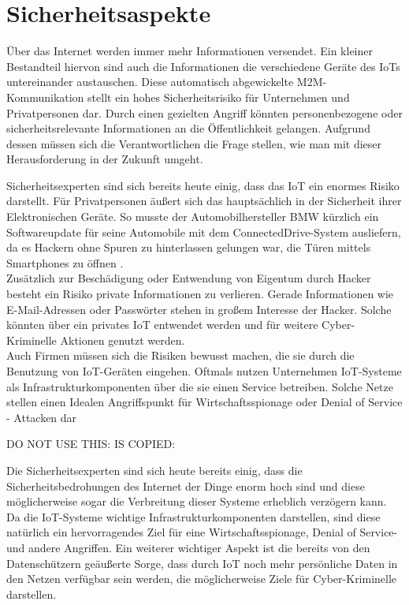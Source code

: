 \section{Sicherheitsaspekte}\label{s:Sicherheitsaspekte}

Über das Internet werden  immer mehr Informationen versendet. Ein kleiner Bestandteil hiervon sind auch die Informationen die verschiedene Geräte des \ac{IoT}s untereinander austauschen.
Diese automatisch abgewickelte \ac{M2M}-Kommunikation stellt ein hohes Sicherheitsrisiko für Unternehmen und Privatpersonen dar. Durch einen gezielten Angriff könnten personenbezogene oder sicherheitsrelevante Informationen an die Öffentlichkeit gelangen. Aufgrund dessen müssen sich die Verantwortlichen die Frage stellen, wie man mit dieser Herausforderung in der Zukunft umgeht. 

Sicherheitsexperten sind sich bereits heute einig, dass das \ac{IoT} ein enormes Risiko darstellt\cite{ws:iotsec}. Für Privatpersonen äußert sich das hauptsächlich in der Sicherheit ihrer Elektronischen Geräte. So musste der Automobilhersteller BMW kürzlich ein Softwareupdate für seine Automobile mit dem ConnectedDrive-System ausliefern, da es Hackern ohne Spuren zu hinterlassen gelungen war, die Türen mittels Smartphones zu öffnen \cite{ws:zeitbmw}.\\

Zusätzlich zur Beschädigung oder Entwendung von Eigentum durch Hacker besteht ein Risiko private Informationen zu verlieren. Gerade Informationen wie E-Mail-Adressen oder Passwörter stehen in großem Interesse der Hacker. Solche könnten über ein privates \ac{IoT} entwendet werden und für weitere Cyber-Kriminelle Aktionen genutzt werden. \\

Auch Firmen müssen sich die Risiken bewusst machen, die sie durch die Benutzung von \ac{IoT}-Geräten eingehen. Oftmals nutzen Unternehmen \ac{IoT}-Systeme als Infrastrukturkomponenten über die sie einen Service betreiben. Solche Netze stellen einen Idealen Angriffspunkt für Wirtschaftsspionage oder Denial of Service - Attacken dar


DO NOT USE THIS: IS COPIED:




Die Sicherheitsexperten sind sich heute bereits einig, dass die Sicherheitsbedrohungen des Internet der Dinge enorm hoch sind und diese möglicherweise sogar die Verbreitung dieser Systeme erheblich verzögern kann. Da die IoT-Systeme wichtige Infrastrukturkomponenten darstellen, sind diese natürlich ein hervorragendes Ziel für eine Wirtschaftsspionage, Denial of Service- und andere Angriffen. Ein weiterer wichtiger Aspekt ist die bereits von den Datenschützern geäußerte Sorge, dass durch IoT noch mehr persönliche Daten in den Netzen verfügbar sein werden, die möglicherweise Ziele für Cyber-Kriminelle darstellen.


